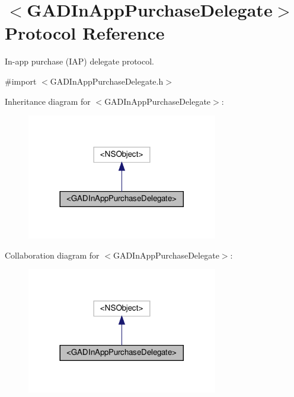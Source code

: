 \hypertarget{protocolGADInAppPurchaseDelegate-p}{}\section{$<$G\+A\+D\+In\+App\+Purchase\+Delegate$>$ Protocol Reference}
\label{protocolGADInAppPurchaseDelegate-p}


In-\/app purchase (I\+AP) delegate protocol.  




{\ttfamily \#import $<$G\+A\+D\+In\+App\+Purchase\+Delegate.\+h$>$}



Inheritance diagram for $<$G\+A\+D\+In\+App\+Purchase\+Delegate$>$\+:
\nopagebreak
\begin{figure}[H]
\begin{center}
\leavevmode
\includegraphics[width=236pt]{protocolGADInAppPurchaseDelegate-p__inherit__graph}
\end{center}
\end{figure}


Collaboration diagram for $<$G\+A\+D\+In\+App\+Purchase\+Delegate$>$\+:
\nopagebreak
\begin{figure}[H]
\begin{center}
\leavevmode
\includegraphics[width=236pt]{protocolGADInAppPurchaseDelegate-p__coll__graph}
\end{center}
\end{figure}
